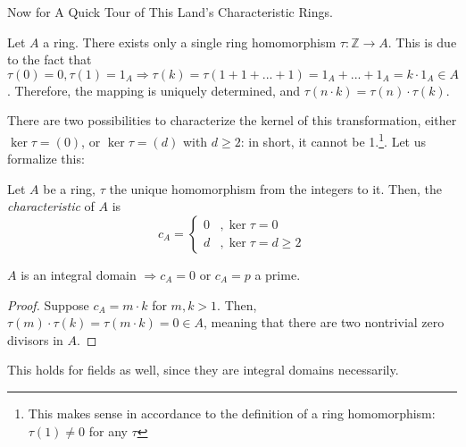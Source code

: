 Now for A Quick Tour of This Land's Characteristic Rings. 

Let $A$ a ring. There exists only a single ring homomorphism $\tau: \mathbb{Z} \to A$. This is due to the fact that $\tau(0) = 0, \tau(1) = 1_A \Rightarrow \tau(k) = \tau(1 + 1 + ... + 1) = 1_A + ... + 1_A = k \cdot 1_A \in A$. Therefore, the mapping is uniquely determined, and $\tau(n \cdot k) = \tau(n) \cdot \tau(k)$. 

There are two possibilities to characterize the kernel of this transformation, either $\ker \tau = (0)$, or $\ker \tau = (d)$ with $d \geqslant 2$: in short, it cannot be 1.\footnote{This makes sense in accordance to the definition of a ring homomorphism: $\tau(1) \neq 0$ for any $\tau$}. Let us formalize this: 

\begin{definition}
  Let $A$ be a ring, $\tau$ the unique homomorphism from the integers to it. Then, the \emph{characteristic} of $A$ is 
  \[
    c_A = \begin{cases}
      0 &, \ker \tau = 0 \\
      d &, \ker \tau = d \geqslant 2
    \end{cases}
  \]
\end{definition}

\begin{theorem*}
  $A$ is an integral domain $\Rightarrow c_A = 0$ or $c_A  = p$ a prime.  
\end{theorem*}
\begin{proof}
  Suppose $c_A = m \cdot k$ for $m, k > 1$. Then, $\tau(m) \cdot \tau(k) = \tau(m \cdot k) = 0 \in A$, meaning that there are two nontrivial zero divisors in $A$. 
\end{proof}
This holds for fields as well, since they are integral domains necessarily. 

